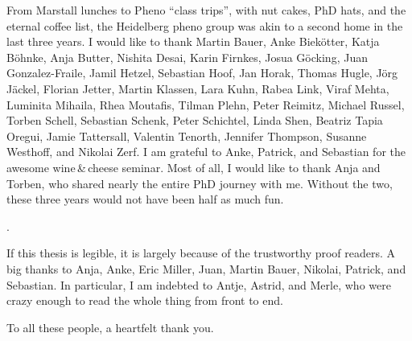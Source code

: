 From Marstall lunches to Pheno ``class trips'', with nut cakes, PhD
hats, and the eternal coffee list, the Heidelberg pheno group was akin
to a second home in the last three years. I would like to thank Martin
Bauer, Anke Biek\"otter, Katja B\"ohnke, Anja Butter, Nishita Desai,
Karin Firnkes, Josua G\"ocking, Juan Gonzalez-Fraile, Jamil Hetzel,
Sebastian Hoof, Jan Horak, Thomas Hugle, J\"org J\"ackel, Florian
Jetter, Martin Klassen, Lara Kuhn, Rabea Link, Viraf Mehta, Luminita
Mihaila, Rhea Moutafis, Tilman Plehn, Peter Reimitz, Michael Russel,
Torben Schell, Sebastian Schenk, Peter Schichtel, Linda Shen, Beatriz
Tapia Oregui, Jamie Tattersall, Valentin Tenorth, Jennifer Thompson,
Susanne Westhoff, and Nikolai Zerf. I am grateful to Anke, Patrick,
and Sebastian for the awesome wine\,\&\,cheese seminar. Most of all, I
would like to thank Anja and Torben, who shared nearly the entire PhD
journey with me. Without the two, these three years would not have
been half as much fun.

. 


If this thesis is legible, it is largely because of the trustworthy
proof readers. A big thanks to Anja, Anke, Eric Miller, Juan, Martin
Bauer, Nikolai, Patrick, and Sebastian. In particular, I am
indebted to Antje, Astrid, and Merle, who were crazy enough to read
the whole thing from front to end.

To all these people, a heartfelt thank you.
